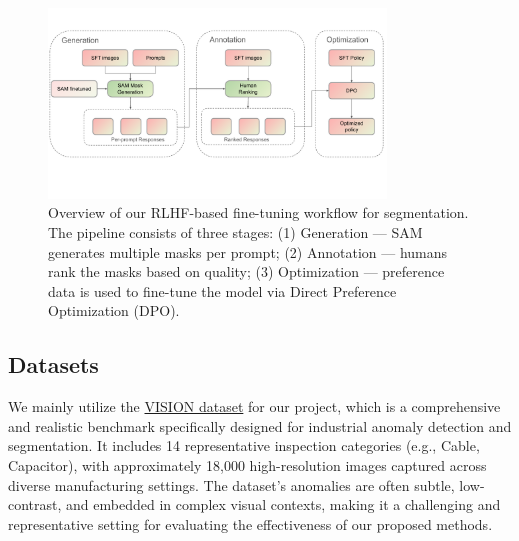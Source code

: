 \documentclass[11pt]{article}
\begin{document}




\begin{figure}[tb]
    \centering
    \includegraphics[width=0.8\textwidth]{figs/pipeline.pdf}
    \caption{Overview of our RLHF-based fine-tuning workflow for segmentation. The pipeline consists of three stages: (1) Generation — SAM generates multiple masks per prompt; (2) Annotation — humans rank the masks based on quality; (3) Optimization — preference data is used to fine-tune the model via Direct Preference Optimization (DPO).}
    \label{fig:training_pipeline}
\end{figure}


\subsection{Datasets}
We mainly utilize the \href{https://huggingface.co/datasets/VISION-Workshop/VISION-Datasets}{VISION dataset} for our project, which is a comprehensive and realistic benchmark specifically designed for industrial anomaly detection and segmentation. It includes 14 representative inspection categories (e.g., Cable, Capacitor), with approximately 18,000 high-resolution images captured across diverse manufacturing settings. The dataset's anomalies are often subtle, low-contrast, and embedded in complex visual contexts, making it a challenging and representative setting for evaluating the effectiveness of our proposed methods.
\end{document}
